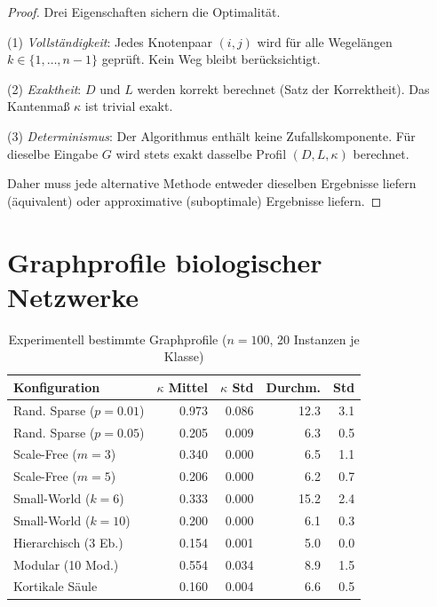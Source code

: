﻿\documentclass[a4paper,12pt,openany,oneside]{book}
\theoremstyle{definition}
\theoremstyle{plain}
\theoremstyle{remark}
\begin{document}
\begin{proof}
  Drei Eigenschaften sichern die Optimalit\"at.

  (1) \emph{Vollst\"andigkeit}: Jedes Knotenpaar $(i,j)$ wird f\"ur alle
  Wegel\"angen $k \in \{1,\ldots,n-1\}$ gepr\"uft. Kein Weg bleibt
  ber\"ucksichtigt.

  (2) \emph{Exaktheit}: $D$ und $L$ werden korrekt berechnet (Satz der
  Korrektheit). Das Kantenma\ss{} $\kappa$ ist trivial exakt.

  (3) \emph{Determinismus}: Der Algorithmus enth\"alt keine Zufallskomponente.
  F\"ur dieselbe Eingabe $G$ wird stets exakt dasselbe Profil $(D,L,\kappa)$
  berechnet.

  Daher muss jede alternative Methode entweder dieselben Ergebnisse
  liefern (\"aquivalent) oder approximative (suboptimale) Ergebnisse liefern.
\end{proof}

\section{Graphprofile biologischer Netzwerke}

\begin{table}[ht]
  \centering\small
  \caption{Experimentell bestimmte Graphprofile ($n=100$, 20 Instanzen je Klasse)}
  \label{tab:graphprofile}
  \renewcommand{\arraystretch}{1.2}
  \begin{tabular}{@{}lrrrr@{}}
    \toprule
    \textbf{Konfiguration}
      & \textbf{$\kappa$ Mittel}
      & \textbf{$\kappa$ Std}
      & \textbf{Durchm.}
      & \textbf{Std} \\
    \midrule
    Rand. Sparse ($p{=}0.01$) & 0.973 & 0.086 & 12.3 & 3.1 \\
    Rand. Sparse ($p{=}0.05$) & 0.205 & 0.009 &  6.3 & 0.5 \\
    Scale-Free ($m{=}3$)      & 0.340 & 0.000 &  6.5 & 1.1 \\
    Scale-Free ($m{=}5$)      & 0.206 & 0.000 &  6.2 & 0.7 \\
    Small-World ($k{=}6$)     & 0.333 & 0.000 & 15.2 & 2.4 \\
    Small-World ($k{=}10$)    & 0.200 & 0.000 &  6.1 & 0.3 \\
    Hierarchisch (3 Eb.)      & 0.154 & 0.001 &  5.0 & 0.0 \\
    Modular (10 Mod.)         & 0.554 & 0.034 &  8.9 & 1.5 \\
    Kortikale S\"aule         & 0.160 & 0.004 &  6.6 & 0.5 \\
    \bottomrule
  \end{tabular}
\end{table}
\end{document}
